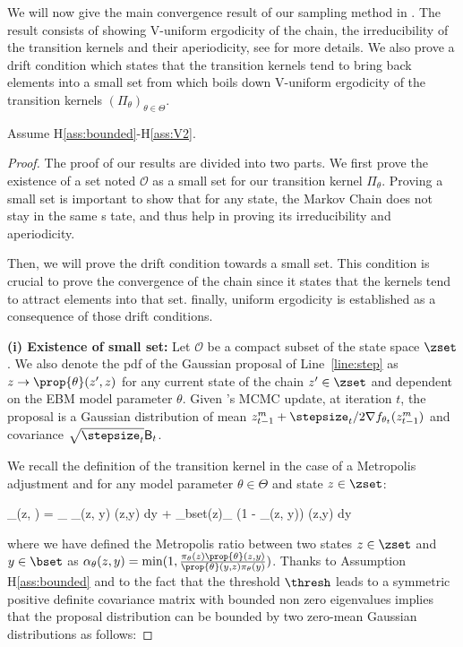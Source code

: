 \documentclass{article}
\begin{document}
We will now give the main convergence result of our sampling method in \algo.
The result consists of showing V-uniform ergodicity of the chain, the irreducibility of the transition kernels and their aperiodicity, see \cite{meyn2012markov} for more details. 
We also prove a drift condition which states that the transition kernels tend to bring back elements into a small set from which boils down V-uniform ergodicity of the transition kernels $(\Pi_\theta)_{\theta \in \Theta}$.


\begin{Theorem}
Assume H\ref{ass:bounded}-H\ref{ass:V2}.

\end{Theorem}


\begin{proof}
The proof of our results are divided into two parts.
We first prove the existence of a set noted $\mathcal{O}$ as a small set for our transition kernel $\Pi_\theta$.
Proving a small set is important to show that for any state, the Markov Chain does not stay in the same s
tate, and thus help in proving its irreducibility and aperiodicity.

Then, we will prove the drift condition towards a small set.
This condition is crucial to prove the convergence of the chain since it states that the kernels tend to attract elements into that set. 
finally, uniform ergodicity is established as a consequence of those drift conditions.

\medskip
\noindent \textbf{(i) Existence of small set: }
Let $\mathcal{O}$ be a compact subset of the state space $\zset$.
We also denote the pdf of the Gaussian proposal of Line~\ref{line:step} as $z \to \prop{\theta}(z',z)$ for any current state of the chain $z' \in \zset$ and dependent on the EBM model parameter $\theta$.
Given \algo's MCMC update, at iteration $t$, the proposal is a Gaussian distribution of mean $z_{t-1}^m+ \stepsize_t/2  \nabla f_{\theta_t}(z_{t-1}^m)$ and covariance $\sqrt{\stepsize_t} \mathsf{B}_t$.

We recall the definition of the transition kernel in the case of a Metropolis adjustment and for any model parameter $\theta \in \Theta$ and state $z \in \zset$:

\beq 
\Pi_\theta(z, \bset) = \int_{\bset} \alpha_\theta(z, y) \prop{\theta}(z,y) \textrm{d}y + _bset(z)\int_{\zset} (1 - \alpha_\theta(z, y)) \prop{\theta}(z,y) \textrm{d}y
\eeq

where we have defined the Metropolis ratio between two states $z \in \zset$ and $y \in \bset$ as $\alpha_\theta(z, y) = \textrm{min}(1, \frac{\pi_\theta(z)  \prop{\theta}(z,y)}{\prop{\theta}(y,z) \pi_\theta(y)  })$.
Thanks to Assumption H\ref{ass:bounded} and to the fact that the threshold $\thresh$ leads to a symmetric positive definite covariance matrix with bounded non zero eigenvalues implies that the proposal distribution can be bounded by two zero-mean Gaussian distributions as follows:


\end{proof}
\end{document}
